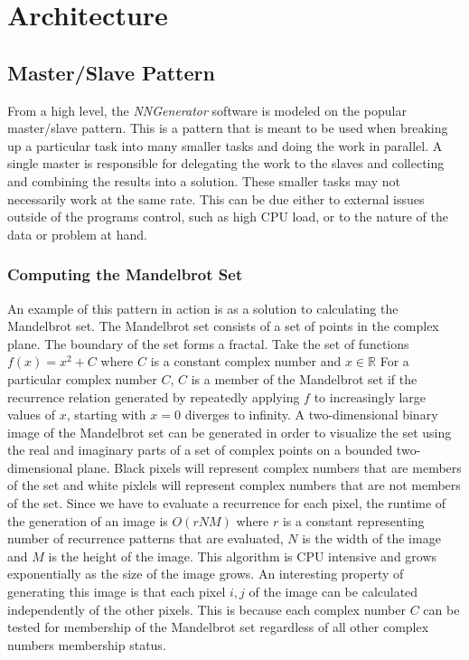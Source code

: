\chapter[Architecture]{Architecture}

\section{Master/Slave Pattern}
From a high level, the {\em NNGenerator} software is modeled on the popular master/slave pattern. 
This is a pattern that is meant to be used when breaking up a particular task into many smaller tasks and doing the work in parallel.
A single master is responsible for delegating the work to the slaves and collecting and combining the results into a solution.
These smaller tasks may not necessarily work at the same rate.
This can be due either to external issues outside of the programs control, such as high CPU load, or to the nature of the data or problem at hand.

\subsection{Computing the Mandelbrot Set}
An example of this pattern in action is as a solution to calculating the Mandelbrot set.
The Mandelbrot set consists of a set of points in the complex plane. The boundary of the set forms a fractal.
Take the set of functions $f(x)=x^2 + C$ where $C$ is a constant complex number
and $x \in \mathbb{R}$ 
For a particular complex number $C$, $C$ is a member of the Mandelbrot set if
the recurrence relation generated by repeatedly applying $f$ to increasingly large values of $x$, starting with $x=0$ diverges to infinity. 
A two-dimensional binary image of the Mandelbrot set can be generated in order to visualize the set using the real and imaginary parts of a set of 
complex points on a bounded two-dimensional plane. 
Black pixels will represent complex numbers that are members of the set and white pixlels will represent complex numbers that are not members of the set.
Since we have to evaluate a recurrence for each pixel, the runtime of the generation of an image is $O(rNM)$ where $r$ is a constant representing number of recurrence patterns that are evaluated, $N$ is the width of the image and $M$ is the height of the image.
This algorithm is CPU intensive and grows exponentially as the size of the image grows. 
An interesting property of generating this image is that each pixel $i,j$ of the image can be calculated independently of the other pixels.
This is because each complex number $C$ can be tested for membership of the Mandelbrot set regardless of all other complex numbers membership status.
 
